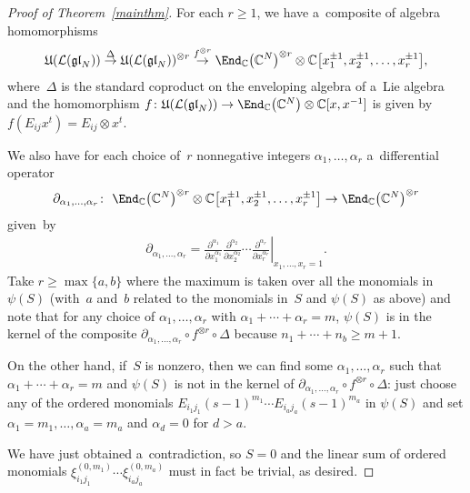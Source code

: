 \begin{proof}[Proof of Theorem~\ref{mainthm}]
For each $r \geq 1$, we have a~composite of algebra homomorphisms
\begin{gather*}
\mathfrak{U}(\mathcal{L}(\mathfrak{gl}_N)) \stackrel{\Delta}{\to}
\mathfrak{U}(\mathcal{L}(\mathfrak{gl}_N))^{\otimes r} \stackrel{f^{\otimes r}}{\rightarrow}
\End_{\mathbb{C}}\big(\mathbb{C}^N\big)^{\otimes r} \otimes \mathbb{C}\big[x_1^{\pm 1},x_2^{\pm 1},\ldots,x_r^{\pm 1}\big],
\end{gather*}
where~$\Delta$ is the standard coproduct on the enveloping algebra of a~Lie algebra and the homomorphism $f\colon
\mathfrak{U}(\mathcal{L}(\mathfrak{gl}_N)) \to \End_{\mathbb{C}}\big(\mathbb{C}^N\big) \otimes
\mathbb{C}[x,x^{-1}]$ is given by $f(E_{ij}x^t) = E_{ij} \otimes x^t$.

We also have for each choice of~$r$ nonnegative integers $\alpha_1, \ldots, \alpha_r$ a~dif\/ferential operator
\begin{gather*}
\partial_{\alpha_1,\ldots,\alpha_r}\colon \ \End_{\mathbb{C}}\big(\mathbb{C}^N\big)^{\otimes r} \otimes \mathbb{C}\big[x_1^{\pm
1},x_2^{\pm 1},\ldots,x_r^{\pm 1}\big] \to \End_{\mathbb{C}}\big(\mathbb{C}^N\big)^{\otimes r}
\end{gather*}
given~by
\begin{gather*}
\partial_{\alpha_1, \ldots, \alpha_r}=\left.\frac{\partial^{\alpha_1}}{\partial x_1^{\alpha_1}}
\frac{\partial^{\alpha_2}}{\partial x_2^{\alpha_2}} \cdots \frac{\partial^{\alpha_r}}{\partial x_r^{\alpha_r}}
\right\rvert_{x_1,\ldots,x_r=1}.
\end{gather*}
Take $r \geq \max\{a,b\}$ where the maximum is taken over all the monomials in $\psi(S)$ (with~$a$ and~$b$ related to
the monomials in~$S$ and $\psi(S)$ as above) and note that for any choice of $\alpha_1,\ldots,\alpha_r$ with $\alpha_1+
\cdots + \alpha_r=m$, $\psi(S)$ is in the kernel of the composite $\partial_{\alpha_1,\ldots,\alpha_r} \circ f^{\otimes
r} \circ \Delta$ because $n_1 + \cdots + n_b \geq m+1$.

On the other hand, if~$S$ is nonzero, then we can f\/ind some $\alpha_1,\ldots,\alpha_r$ such that $\alpha_1 + \cdots +
\alpha_r=m$ and $\psi(S)$ is not in the kernel of $\partial_{\alpha_1,\ldots,\alpha_r} \circ f^{\otimes r} \circ
\Delta$: just choose any of the ordered monomials $E_{i_1 j_1}(s-1)^{m_1} \cdots E_{i_a j_a} (s-1)^{m_a}$ in $\psi(S)$
and set $\alpha_1=m_1, \ldots, \alpha_a=m_a$ and $\alpha_d=0$ for $d>a$.

We have just obtained a~contradiction, so $S=0$ and the linear sum of ordered monomials $\xi_{i_1 j_1}^{(0,m_1)} \cdots
\xi_{i_a j_a}^{(0,m_a)}$ must in fact be trivial, as desired.
\end{proof}

